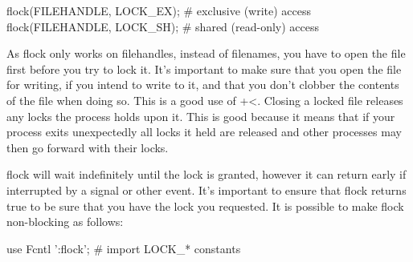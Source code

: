\documentclass{report}
\begin{document}
\begin{itemize}
\begin{perlcode}
                flock(FILEHANDLE, LOCK_EX); # exclusive (write) access
                flock(FILEHANDLE, LOCK_SH); # shared (read-only) access
            \end{perlcode}
            \bigbreak \noindent 
            As flock only works on filehandles, instead of filenames, you have to open the file first before you try to lock it. It’s important to make sure that you open the file for writing, if you intend to write to it, and that you don’t clobber the contents of the file when doing so. This is a good use of +<. Closing a locked file releases any locks the process holds upon it. This is good because it means that if your process exits unexpectedly all locks it held are released and other processes may then go forward with their locks.
            \bigbreak \noindent 
            \bigbreak \noindent 
            flock will wait indefinitely until the lock is granted, however it can return early if interrupted by a signal or other event. It’s important to ensure that flock returns true to be sure that you have the lock you requested. It is possible to make flock non-blocking as follows:
            \bigbreak \noindent 
            \begin{perlcode}
                use Fcntl ’:flock’; # import LOCK_* constants


\end{perlcode}
\end{itemize}
\end{document}
